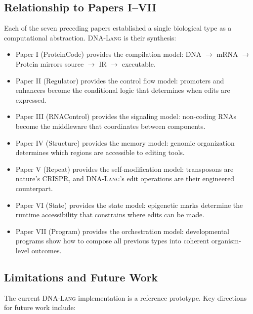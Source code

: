 \documentclass[12pt,a4paper]{article}
\newcommand{\DNALang}{\textsc{DNA-Lang}}
\begin{document}
\subsection{Relationship to Papers I--VII}

Each of the seven preceding papers established a single biological type as a computational abstraction. \DNALang{} is their synthesis:

\begin{itemize}
    \item Paper I (ProteinCode) provides the compilation model: DNA $\to$ mRNA $\to$ Protein mirrors source $\to$ IR $\to$ executable.
    \item Paper II (Regulator) provides the control flow model: promoters and enhancers become the conditional logic that determines when edits are expressed.
    \item Paper III (RNAControl) provides the signaling model: non-coding RNAs become the middleware that coordinates between components.
    \item Paper IV (Structure) provides the memory model: genomic organization determines which regions are accessible to editing tools.
    \item Paper V (Repeat) provides the self-modification model: transposons are nature's CRISPR, and \DNALang{}'s edit operations are their engineered counterpart.
    \item Paper VI (State) provides the state model: epigenetic marks determine the runtime accessibility that constrains where edits can be made.
    \item Paper VII (Program) provides the orchestration model: developmental programs show how to compose all previous types into coherent organism-level outcomes.
\end{itemize}

\subsection{Limitations and Future Work}

The current \DNALang{} implementation is a reference prototype. Key directions for future work include:
\end{document}
